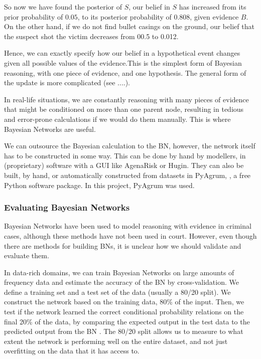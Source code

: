 \documentclass[12pt]{article}
\begin{document}
So now we have found the posterior of $S$, our belief in $S$ has increased from its prior probability of $0.05$, to its posterior probability of $0.808$, given evidence $B$. On the other hand, if we do not find bullet casings on the ground, our belief that the suspect shot the victim decreases from 00.5 to 0.012. 


Hence, we can exactly specify how our belief in a hypothetical event changes given all possible values of the evidence.This is the simplest form of Bayesian reasoning, with one piece of evidence, and one hypothesis. The general form of the update is more complicated (see ....).


In real-life situations, we are constantly reasoning with many pieces of evidence that might be conditioned on more than one parent node, resulting in tedious and error-prone calculations if we would do them manually. This is where Bayesian Networks are useful. 



We can outsource the Bayesian calculation to the BN, however, the network itself has to be constructed in some way. This can be done by hand by modellers, in (proprietary) software with a GUI like AgenaRisk or Hugin. They can also be built, by hand, or automatically constructed from datasets in PyAgrum, \citep{pyagrum2020}, a free Python software package. In this project, PyAgrum was used.



\subsubsection{Evaluating Bayesian Networks}

Bayesian Networks have been used to model reasoning with evidence in criminal cases, although these methods have not been used in court. However, even though there are methods for building BNs, it is unclear how we should validate and evaluate them. 

In data-rich domains, we can train Bayesian Networks on large amounts of frequency data and estimate the accuracy of the BN by cross-validation. We define a training set and a test set of the data (usually a 80/20 split). We construct the network based on the training data, 80\% of the input. Then, we test if the network learned the correct conditional probability relations on the final 20\% of the data, by comparing the expected output in the test data to the predicted output from the BN \citep{chen2012}. The 80/20 split allows us to measure to what extent the network is performing well on the entire dataset, and not just overfitting on the data that it has access to.
\end{document}
